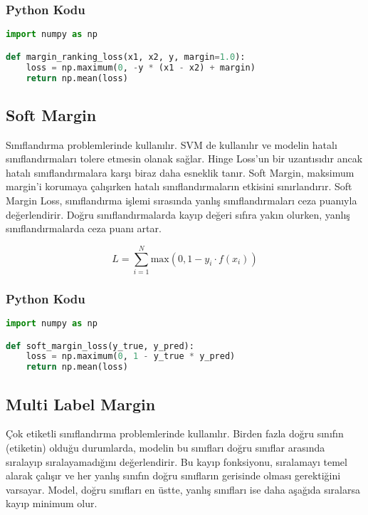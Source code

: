 \subsubsection{Python Kodu}

\begin{lstlisting}[language=Python]
import numpy as np

def margin_ranking_loss(x1, x2, y, margin=1.0):
    loss = np.maximum(0, -y * (x1 - x2) + margin)
    return np.mean(loss)
\end{lstlisting}

\newpage

\subsection{Soft Margin}

Sınıflandırma problemlerinde kullanılır. SVM de kullanılır ve modelin hatalı sınıflandırmaları tolere etmesin olanak sağlar. Hinge Loss'un bir uzantısıdır ancak hatalı sınıflandırmalara karşı biraz daha esneklik tanır. Soft Margin, maksimum margin'i korumaya çalışırken hatalı sınıflandırmaların etkisini sınırlandırır. Soft Margin Loss, sınıflandırma işlemi sırasında yanlış sınıflandırmaları ceza puanıyla değerlendirir. Doğru sınıflandırmalarda kayıp değeri sıfıra yakın olurken, yanlış sınıflandırmalarda ceza puanı artar.

\[ L = \sum_{i=1}^{N} \text{max}(0, 1 - y_i \cdot f(x_i)) \]

\subsubsection{Python Kodu}

\begin{lstlisting}[language=Python]
import numpy as np

def soft_margin_loss(y_true, y_pred):
    loss = np.maximum(0, 1 - y_true * y_pred)
    return np.mean(loss)
\end{lstlisting}

\newpage

\subsection{Multi Label Margin}

Çok etiketli sınıflandırma problemlerinde kullanılır. Birden fazla doğru sınıfın (etiketin) olduğu durumlarda, modelin bu sınıfları doğru sınıflar arasında sıralayıp sıralayamadığını değerlendirir. Bu kayıp fonksiyonu, sıralamayı temel alarak çalışır ve her yanlış sınıfın doğru sınıfların gerisinde olması gerektiğini varsayar. Model, doğru sınıfları en üstte, yanlış sınıfları ise daha aşağıda sıralarsa kayıp minimum olur.

